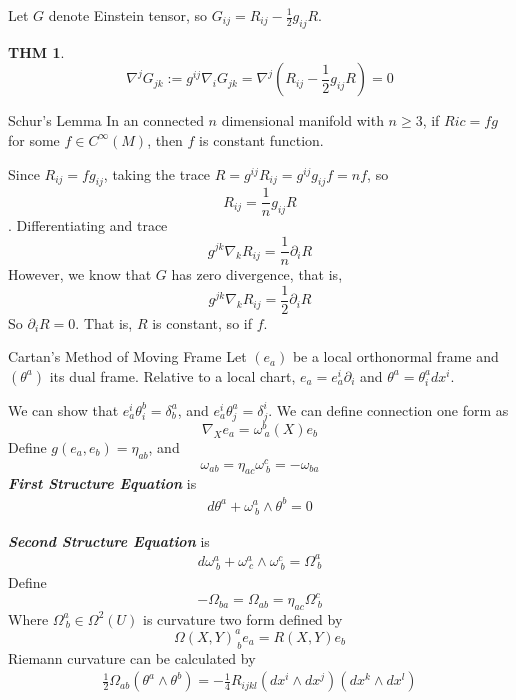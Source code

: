 \documentclass[twocolumn]{article}
\renewcommand{\emph}[1]{\textbf{\textit{#1}}}
\newcommand{\n}{\nabla}
\newcommand{\C}{C^{\infty}}
\newcommand{\p}{\partial}
\newcommand{\W}{\Omega}
\newtheorem{thm}{THM}
\theoremstyle{definition}
\begin{document}
Let $G$ denote Einstein tensor, so $G_{ij} = R_{ij} - \frac{1}{2}g_{ij}R$.

\begin{thm}
	$$
\n ^{j} G_{jk} := g^{ij}\n_{i} G_{jk} = \n^j(R_{ij} - \frac{1}{2}g_{ij}R)= 0
	$$
\end{thm}

\begin{eg}{Schur's Lemma}{}
	In an connected $n$ dimensional manifold with $n \geq 3$, if $Ric = fg$ for some $f \in \C(M)$, then $f$ is constant function.

	\tcblower
	Since $R_{ij} = fg_{ij}$, taking the trace $R = g^{ij}R_{ij} = g^{ij}g_{ij}f = nf$, so 
	$$R_{ij} = \frac{1}{n} g_{ij} R$$.
	Differentiating and trace 
	$$
		g^{jk} \n_{k}R_{ij} = \frac{1}{n} \p_i R 
	$$
	However, we know that $G$ has zero divergence, that is, 
	$$
		g^{jk} \n_{k}R_{ij} = \frac{1}{2} \p_i R 
	$$
	So $\p_i R = 0$. That is, $R$ is constant, so if $f$.
\end{eg}

\begin{fthm}{Cartan's Method of Moving Frame}{}
	Let $(e_a)$ be a local orthonormal frame and $(\theta ^a)$ its dual frame.
	Relative to a local chart, $e_a = e^i_a \p_i$ and $\theta^a = \theta^a_i dx^i$.

	We can show that $e^i_a \theta^b_i = \delta^a_b$, and $e^i_a \theta^a_j = \delta^i_j$.
	We can define connection one form as 
	$$
	\n_X e_a= \omega^b_{\ a}(X) e_b
	$$
	Define $g(e_a, e_b) = \eta_{ab}$, and 
	$$
	\omega_{ab} = \eta_{ac} \omega^c_{\ b} = - \omega_{ba}
	$$
	\emph{First Structure Equation} is
	\begin{align}
		d \theta^a + \omega^a_{\ b} \wedge \theta^b = 0
	\end{align}

	\emph{Second Structure Equation} is
	\begin{align}
		d \omega^a_{\ b} + \omega^a_{\ c} \wedge \omega^c_{\ b} = \Omega^a_{\ b}
	\end{align}
	Define 
	$$
		- \W_{ba} = \W_{ab} = \eta_{ac}\W^c_{\ b} 
	$$
	Where $\W^a_{\ b} \in \W^2(U)$ is curvature two form defined by 
	$$
		\W(X,Y)^a_{\ b} e_a = R(X, Y) e_b
	$$
	Riemann curvature can be calculated by 
	\begin{align}
		\frac{1}{2} \W_{ab}(\theta^a \wedge \theta^b) = - \frac{1}{4} R_{ijkl}(dx^i \wedge dx^j)(dx^k \wedge dx^l)
	\end{align}
\end{fthm}
\end{document}
